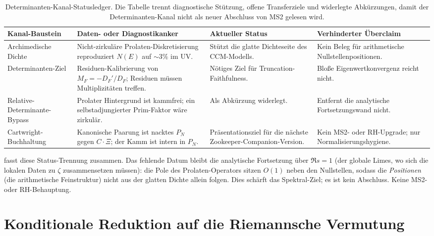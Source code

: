 \documentclass[12pt,a4paper]{article}
\theoremstyle{definition}
\theoremstyle{remark}
\begin{document}
\begin{table}[h]
\centering
\small
\setlength{\tabcolsep}{3pt}
\begin{tabular}{p{}p{}p{}p{}}
\toprule
Kanal-Baustein & Daten- oder Diagnostikanker & Aktueller Status & Verhinderter Überclaim \\
\midrule
Archimedische Dichte & Nicht-zirkuläre Prolaten-Diskretisierung reproduziert $N(E)$ auf $\sim 3\%$ im UV. &
Stützt die glatte Dichteseite des CCM-Modells. & Kein Beleg für arithmetische Nullstellenpositionen. \\
Determinanten-Ziel & Residuen-Kalibrierung von $M_F=-D_F'/D_F$; Residuen müssen Multiplizitäten treffen. &
Nötiges Ziel für Truncation-Faithfulness. & Bloße Eigenwertkonvergenz reicht nicht. \\
Relative-Determinante-Bypass & Prolater Hintergrund ist kammfrei; ein selbstadjungierter Prim-Faktor wäre zirkulär. &
Als Abkürzung widerlegt. & Entfernt die analytische Fortsetzungswand nicht. \\
Cartwright-Buchhaltung & Kanonische Paarung ist nacktes $P_N$ gegen $C\cdot\Xi$; der Kamm ist intern in $P_N$. &
Präsentationsziel für die nächste Zookeeper-Companion-Version. & Kein MS2- oder RH-Upgrade; nur Normalisierungshygiene. \\
\bottomrule
\end{tabular}
\caption{Determinanten-Kanal-Statusledger. Die Tabelle trennt diagnostische Stützung, offene
Transferziele und widerlegte Abkürzungen, damit der Determinanten-Kanal nicht als neuer Abschluss von MS2 gelesen wird.}
\label{tab:det-channel-ledger}
\end{table}

\noindent
{} fasst diese Status-Trennung zusammen. Das fehlende
Datum bleibt die analytische Fortsetzung über $\Re s=1$ (der globale Limes, wo
sich die lokalen Daten zu $\zeta$ zusammensetzen müssen): die Pole des
Prolaten-Operators sitzen $O(1)$ neben den Nullstellen, sodass die
\emph{Positionen} (die arithmetische Feinstruktur) nicht aus der glatten Dichte
allein folgen. Dies schärft das Spektral-Ziel; es ist kein Abschluss. Keine MS2-
oder RH-Behauptung.


\section{Konditionale Reduktion auf die Riemannsche Vermutung}
\label{sec:RH}
\end{document}
